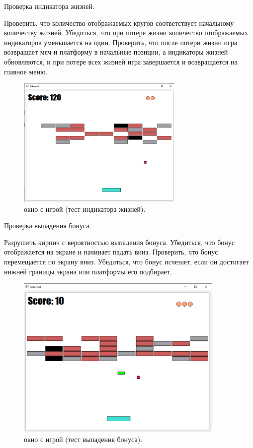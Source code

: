 Проверка индикатора жизней. 

Проверить, что количество отображаемых кругов соответствует начальному количеству жизней. Убедиться, что при потере жизни количество отображаемых индикаторов уменьшается на один. Проверить, что после потери жизни игра возвращает мяч и платформу в начальные позиции, а индикаторы жизней обновляются, и при потере всех жизней игра завершается и возвращается на главное меню.
\clearpage
\begin{figure} [!htp]
  \centering
  \graphicspath{ {img/} }
  \includegraphics[width=8cm]{image/5.png}
  \caption{окно с игрой (тест индикатора жизней). }
  \label{fig:image}
\end{figure}


Проверка выпадения бонуса. 

Разрушить кирпич с вероятностью выпадения бонуса. Убедиться, что бонус отображается на экране и начинает падать вниз. Проверить, что бонус перемещается по экрану вниз. Убедиться, что бонус исчезает, если он достигает нижней границы экрана или платформы его подбирает.

\begin{figure} [h!]
  \centering
  \graphicspath{ {img/} }
  \includegraphics[width=10cm]{image/6.png}
  \caption{окно с игрой (тест выпадения бонуса). }
  \label{fig:image}
\end{figure}

